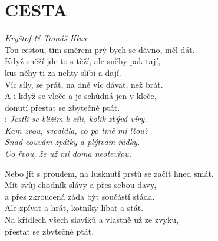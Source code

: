\section*{\Huge CESTA}
\emph{Kryštof \& Tomáš Klus}\\

Tou cestou, tím směrem prý bych se dávno, měl dát.\\
Když sněží jde to s těží, ale sněhy pak tají,\\
kus něhy ti za nehty slíbí a dají.\\

Víc síly, se prát, na dně víc dávat, než brát.\\
A i když se vleče a je schůdná jen v kleče,\\
donutí přestat se zbytečně ptát.\\

\textregistered:
\emph{
Jestli se blížím k cíli, kolik zbývá víry.\\
Kam zvou, svodidla, co po tmě mi lžou?\\
Snad couvám zpátky a plýtvám řádky.\\
Co řvou, že už mi doma neotevřou.\\
}

Nebo jít s proudem, na lusknutí prstů se začít hned smát.\\
Mít svůj chodník slávy a přes sebou davy,\\
a přes zkroucená záda být součástí stáda.\\

Ale zpívat a hrát, kotníky líbat a stát.\\
Na křídlech všech slavíků a vlastně už ze zvyku,\\
přestat se zbytečně ptát.

\textregistered \textregistered

\newpage
